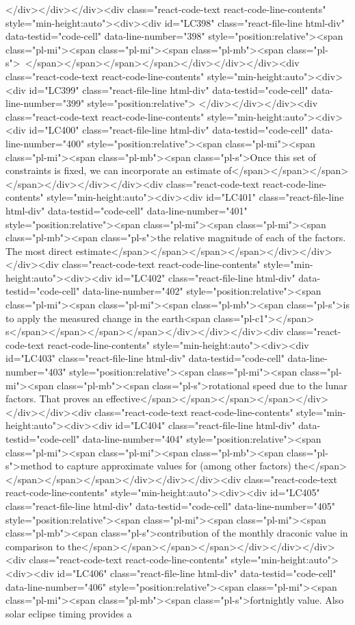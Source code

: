 {{{{{</div></div></div><div class="react-code-text react-code-line-contents" style="min-height:auto"><div><div id="LC398" class="react-file-line html-div" data-testid="code-cell" data-line-number="398" style="position:relative"><span class="pl-mi"><span class="pl-mi"><span class="pl-mb"><span class="pl-s">~</span></span></span></span></div></div></div><div class="react-code-text react-code-line-contents" style="min-height:auto"><div><div id="LC399" class="react-file-line html-div" data-testid="code-cell" data-line-number="399" style="position:relative">
</div></div></div><div class="react-code-text react-code-line-contents" style="min-height:auto"><div><div id="LC400" class="react-file-line html-div" data-testid="code-cell" data-line-number="400" style="position:relative"><span class="pl-mi"><span class="pl-mi"><span class="pl-mb"><span class="pl-s">Once this set of constraints is fixed, we can incorporate an estimate of</span></span></span></span></div></div></div><div class="react-code-text react-code-line-contents" style="min-height:auto"><div><div id="LC401" class="react-file-line html-div" data-testid="code-cell" data-line-number="401" style="position:relative"><span class="pl-mi"><span class="pl-mi"><span class="pl-mb"><span class="pl-s">the relative magnitude of each of the factors. The most direct estimate</span></span></span></span></div></div></div><div class="react-code-text react-code-line-contents" style="min-height:auto"><div><div id="LC402" class="react-file-line html-div" data-testid="code-cell" data-line-number="402" style="position:relative"><span class="pl-mi"><span class="pl-mi"><span class="pl-mb"><span class="pl-s">is to apply the measured change in the earth<span class="pl-c1">\textquotesingle</span> s</span></span></span></span></div></div></div><div class="react-code-text react-code-line-contents" style="min-height:auto"><div><div id="LC403" class="react-file-line html-div" data-testid="code-cell" data-line-number="403" style="position:relative"><span class="pl-mi"><span class="pl-mi"><span class="pl-mb"><span class="pl-s">rotational speed due to the lunar factors. That proves an effective</span></span></span></span></div></div></div><div class="react-code-text react-code-line-contents" style="min-height:auto"><div><div id="LC404" class="react-file-line html-div" data-testid="code-cell" data-line-number="404" style="position:relative"><span class="pl-mi"><span class="pl-mi"><span class="pl-mb"><span class="pl-s">method to capture approximate values for (among other factors) the</span></span></span></span></div></div></div><div class="react-code-text react-code-line-contents" style="min-height:auto"><div><div id="LC405" class="react-file-line html-div" data-testid="code-cell" data-line-number="405" style="position:relative"><span class="pl-mi"><span class="pl-mi"><span class="pl-mb"><span class="pl-s">contribution of the monthly draconic value in comparison to the</span></span></span></span></div></div></div><div class="react-code-text react-code-line-contents" style="min-height:auto"><div><div id="LC406" class="react-file-line html-div" data-testid="code-cell" data-line-number="406" style="position:relative"><span class="pl-mi"><span class="pl-mi"><span class="pl-mb"><span class="pl-s">fortnightly value. Also solar eclipse timing provides a }}}}}
